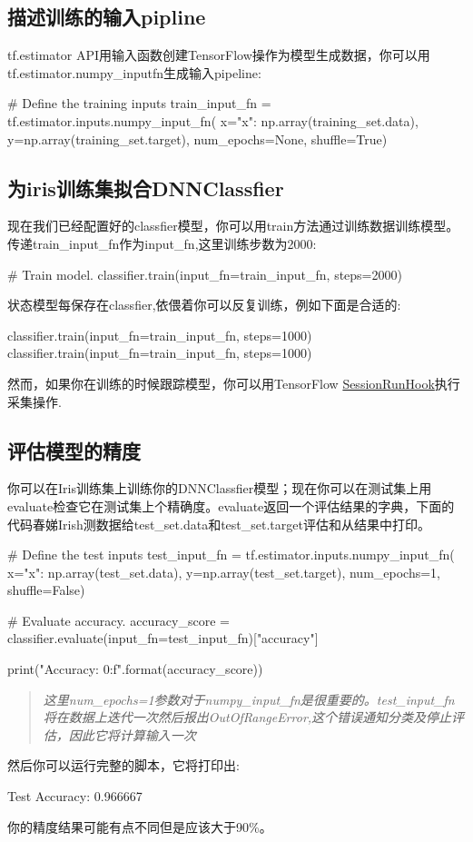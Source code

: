\subsection{描述训练的输入pipline}
tf.estimator API用输入函数创建TensorFlow操作为模型生成数据，你可以用tf.estimator.numpy\_input\-fn生成输入pipeline:
\begin{python}
# Define the training inputs
train_input_fn = tf.estimator.inputs.numpy_input_fn(
    x={"x": np.array(training_set.data)},
    y=np.array(training_set.target),
    num_epochs=None,
    shuffle=True)
\end{python}
\subsection{为iris训练集拟合DNNClassfier}
现在我们已经配置好的classfier模型，你可以用train方法通过训练数据训练模型。传递train\_input\_fn作为input\_fn,这里训练步数为2000:
\begin{python}
# Train model.
classifier.train(input_fn=train_input_fn, steps=2000)
\end{python}
状态模型每保存在classfier,依偎着你可以反复训练，例如下面是合适的:
\begin{python}
classifier.train(input_fn=train_input_fn, steps=1000)
classifier.train(input_fn=train_input_fn, steps=1000)
\end{python}
然而，如果你在训练的时候跟踪模型，你可以用TensorFlow \href{https://www.tensorflow.org/api_docs/python/tf/train/SessionRunHook}{SessionRunHook}执行采集操作.
\subsection{评估模型的精度}
你可以在Iris训练集上训练你的DNNClassfier模型；现在你可以在测试集上用evaluate检查它在测试集上个精确度。evaluate返回一个评估结果的字典，下面的代码春娣Irish测数据给test\_set.data和test\_set.target评估和从结果中打印。
\begin{python}
# Define the test inputs
test_input_fn = tf.estimator.inputs.numpy_input_fn(
    x={"x": np.array(test_set.data)},
    y=np.array(test_set.target),
    num_epochs=1,
    shuffle=False)

# Evaluate accuracy.
accuracy_score = classifier.evaluate(input_fn=test_input_fn)["accuracy"]

print("\nTest Accuracy: {0:f}\n".format(accuracy_score))
\end{python}
\begin{quote}
\emph{这里num\_epochs=1参数对于numpy\_input\_fn是很重要的。test\_input\_fn将在数据上迭代一次然后报出OutOfRangeError,这个错误通知分类及停止评估，因此它将计算输入一次}
\end{quote}
然后你可以运行完整的脚本，它将打印出:
\begin{python}
Test Accuracy: 0.966667
\end{python}
你的精度结果可能有点不同但是应该大于90\%。

